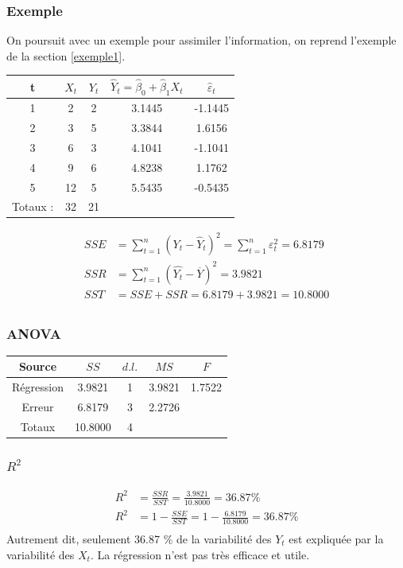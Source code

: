 \documentclass[11pt,french]{report}
\begin{document}
\bigskip
\subsubsection*{Exemple}
On poursuit avec un exemple pour assimiler l'information, on reprend l'exemple de la section \ref{exemple1}.

\bigskip
\begin{center}
\begin{tabular}{|c|c|c|c|c|}
\hline
t & $X_t$ & $Y_t$  & $\hat{Y}_t = \hat{\beta}_0 + \hat{\beta}_1X_t$ & $\hat{\varepsilon}_t$\\
\hline
1 & 2 & 2 & 3.1445 & -1.1445\\
2 & 3 & 5 & 3.3844 & 1.6156\\
3 & 6 & 3 & 4.1041 & -1.1041\\
4 & 9 & 6 & 4.8238 & 1.1762\\
5 & 12 & 5 & 5.5435 & -0.5435\\
\hline
Totaux : & 32 & 21 & & \\
\hline
\end{tabular}
\end{center}

\begin{align*}
SSE &= \sum_{t=1}^n (Y_t - \hat{Y}_t)^2 = \sum_{t=1}^n \varepsilon_t^2 = 6.8179 \\
SSR &= \sum_{t=1}^n (\hat{Y_t} - \overline{Y})^2 = 3.9821 \\
SST &= SSE + SSR = 6.8179 +3.9821 = 10.8000 \\
\end{align*}

\subsubsection*{ANOVA}
\begin{center}
\begin{tabular}{|c|c|c|c|c|}
\hline
Source & $SS$ & $d.l.$ & $MS$ & $F$ \\
\hline
Régression & 3.9821 & 1 & 3.9821 & 1.7522 \\
Erreur & 6.8179 & 3 & 2.2726 & \\
\hline
Totaux & 10.8000 & 4 & & \\
\hline
\end{tabular}
\end{center}

\subsubsection*{$R^2$}
\begin{align*}
R^2 &= \frac{SSR}{SST} = \frac{3.9821}{10.8000} = 36.87 \% \\
R^2 &= 1 - \frac{SSE}{SST} = 1 - \frac{6.8179}{10.8000} = 36.87 \% \\
\end{align*}
Autrement dit, seulement 36.87 \% de la variabilité des $Y_t$ est expliquée par la variabilité des $X_t$. La régression n'est pas très efficace et utile.
\end{document}
